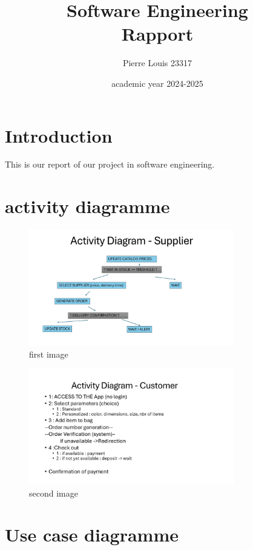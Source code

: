 \documentclass{article}
\title{Software Engineering\\ Rapport}
\author{Pierre Louis 23317}
\date{academic year 2024-2025}
\begin{document}
\maketitle

\section{Introduction}
This is our report of our project in software engineering.

\section{activity diagramme}

\begin{figure}[H]
    \centering
    \includegraphics[width=0.8\textwidth]{images/activity_diagram1.JPG}
    \caption{first image}
    \label{fig:image1}
\end{figure}

\begin{figure}[H]
    \centering
    \includegraphics[width=0.8\textwidth]{images/activity_diagram2.JPG}
    \caption{second image}
    \label{fig:image2}
\end{figure}

\section{Use case diagramme}
\end{document}
